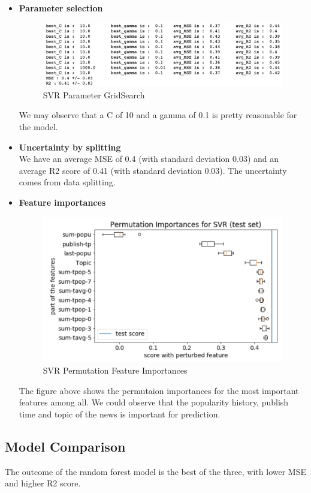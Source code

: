 \documentclass{article}
\begin{document}
\begin{itemize}
\item \textbf{Parameter selection}

\begin{figure}[H]
\centering
\includegraphics[scale=0.4]{"svr_param"}
\caption{SVR Parameter GridSearch}
\end{figure}
We may observe that a C of 10 and a gamma of 0.1 is pretty reasonable for the model. 
\item \textbf{Uncertainty by splitting}\\
We have an average MSE of 0.4 (with standard deviation 0.03) and an average R2 score of 0.41 (with standard deviation 0.03). The uncertainty comes from data splitting.
\item \textbf{Feature importances}
\begin{figure}[H]
\centering
\includegraphics[scale=0.5]{"svr_perm_imp"}
\caption{SVR Permutation Feature Importances}
\end{figure}
The figure above shows the permutaion importances for the most important features among all. We could observe that the popularity history, publish time and topic of the news is important for prediction.
\end{itemize}


\subsection{Model Comparison}
The outcome of the random forest model is the best of the three, with lower MSE and higher R2 score.
\end{document}
